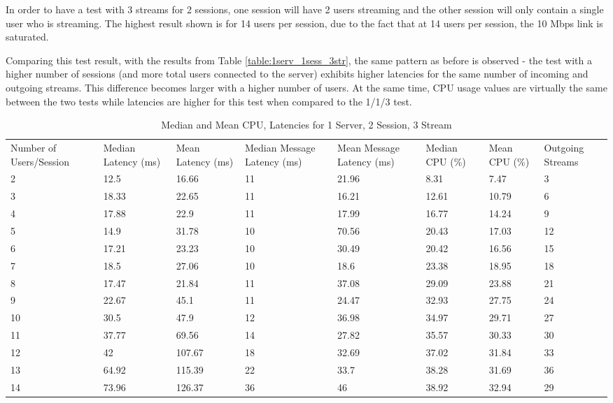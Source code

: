 In order to have a test with 3 streams for 2 sessions, one session will have 2 users streaming and the other session will only contain a single user who is streaming. The highest result shown is for 14 users per session, due to the fact that at 14 users per session, the 10 Mbps link is saturated.

Comparing this test result, with the results from Table \ref{table:1serv_1sess_3str}, the same pattern as before is observed - the test with a higher number of sessions (and more total users connected to the server) exhibits higher latencies for the same number of incoming and outgoing streams. This difference becomes larger with a higher number of users. At the same time, CPU usage values are virtually the same between the two tests while latencies are higher for this test when compared to the 1/1/3 test.

\begin{table}
\caption{Median and Mean CPU, Latencies for 1 Server, 2 Session, 3 Stream}
\label{table:1serv_2sess_3str}
\begin{tabu} to\linewidth{|X[c]|X[c]|X[c]|X[c]|X[c]|X[c]|X[c]|X[c]|}
\everyrow{\hline}
\hline
Number of Users/Session & Median Latency (ms) & Mean Latency (ms) & Median Message Latency (ms) & Mean Message Latency (ms) & Median CPU (\%) & Mean CPU (\%) & Outgoing Streams\\
2 & 12.5 & 16.66 & 11 & 21.96 & 8.31 & 7.47 & 3 \\
3 & 18.33 & 22.65 & 11 & 16.21 & 12.61 & 10.79 & 6 \\
4 & 17.88 & 22.9 & 11 & 17.99 & 16.77 & 14.24 & 9 \\
5 & 14.9 & 31.78 & 10 & 70.56 & 20.43 & 17.03 & 12 \\
6 & 17.21 & 23.23 & 10 & 30.49 & 20.42 & 16.56 & 15 \\
7 & 18.5 & 27.06 & 10 & 18.6 & 23.38 & 18.95 & 18 \\
8 & 17.47 & 21.84 & 11 & 37.08 & 29.09 & 23.88 & 21 \\
9 & 22.67 & 45.1 & 11 & 24.47 & 32.93 & 27.75 & 24 \\
10 & 30.5 & 47.9 & 12 & 36.98 & 34.97 & 29.71 & 27 \\
11 & 37.77 & 69.56 & 14 & 27.82 & 35.57 & 30.33 & 30 \\
12 & 42 & 107.67 & 18 & 32.69 & 37.02 & 31.84 & 33 \\
13 & 64.92 & 115.39 & 22 & 33.7 & 38.28 & 31.69 & 36 \\
14 & 73.96 & 126.37 & 36 & 46 & 38.92 & 32.94 & 29 \\
\end{tabu}
\end{table}

